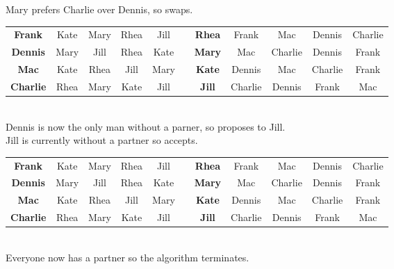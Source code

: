 \documentclass[11pt,a4paper]{article}
\begin{document}
Mary prefers Charlie over Dennis, so swaps.\\
\begin{tabular}{|c|cccc|c|c|cccc|}
  \cline{1-5} \cline{7-11}
  \textbf{Frank} & \cellcolor{red!25}Kate & \cellcolor{red!25}Mary & \cellcolor{green!25}Rhea & Jill & \quad &\textbf{Rhea} & \cellcolor{green!25}Frank & Mac & Dennis & \cellcolor{red!25} Charlie\\
  \textbf{Dennis} & \cellcolor{red!25} Mary & Jill & Rhea & Kate & \quad & \textbf{Mary} & Mac & \cellcolor{green!25}Charlie & \cellcolor{red!25} Dennis & \cellcolor{red!25}Frank\\
  \textbf{Mac} & \cellcolor{green!25} Kate & Rhea & Jill & Mary & \quad & \textbf{Kate} & Dennis & \cellcolor{green!25} Mac & Charlie & \cellcolor{red!25} Frank\\
  \textbf{Charlie} & \cellcolor{red!25} Rhea & \cellcolor{green!25}Mary & Kate & Jill & \quad & \textbf{Jill} & Charlie & Dennis & Frank & Mac\\
  \cline{1-5} \cline{7-11}
\end{tabular}\\
Dennis is now the only man without a parner, so proposes to Jill.\\
Jill is currently without a partner so accepts.\\
\begin{tabular}{|c|cccc|c|c|cccc|}
  \cline{1-5} \cline{7-11}
  \textbf{Frank} & \cellcolor{red!25}Kate & \cellcolor{red!25}Mary & \cellcolor{green!25}Rhea & Jill & \quad &\textbf{Rhea} & \cellcolor{green!25}Frank & Mac & Dennis & \cellcolor{red!25} Charlie\\
  \textbf{Dennis} & \cellcolor{red!25} Mary & \cellcolor{green!25}Jill & Rhea & Kate & \quad & \textbf{Mary} & Mac & \cellcolor{green!25}Charlie & \cellcolor{red!25} Dennis & \cellcolor{red!25}Frank\\
  \textbf{Mac} & \cellcolor{green!25} Kate & Rhea & Jill & Mary & \quad & \textbf{Kate} & Dennis & \cellcolor{green!25} Mac & Charlie & \cellcolor{red!25} Frank\\
  \textbf{Charlie} & \cellcolor{red!25} Rhea & \cellcolor{green!25}Mary & Kate & Jill & \quad & \textbf{Jill} & Charlie & \cellcolor{green!25}Dennis & Frank & Mac\\
  \cline{1-5} \cline{7-11}
\end{tabular}\\
Everyone now has a partner so the algorithm terminates.\\
\end{document}
